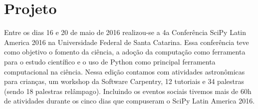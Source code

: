 \documentclass[12pt]{article}
\begin{document}

\section*{Projeto}

Entre os dias 16 e 20 de maio de 2016 realizou-se a 4a Conferência SciPy Latin America 2016 na Universidade Federal de Santa Catarina. Essa conferência teve como objetivo o fomento da ciência, a adoção da computação como ferramenta para o estudo científico e o uso de Python como principal ferramenta computacional na ciência. Nessa edição contamos com atividades astronômicas para crianças,
um workshop da Software Carpentry,
12 tutoriais e 34 palestras (sendo 18 palestras relâmpago).
Incluindo os eventos sociais tivemos mais de 60h de atividades durante os cinco dias que compuseram o SciPy Latin America 2016.
\end{document}
